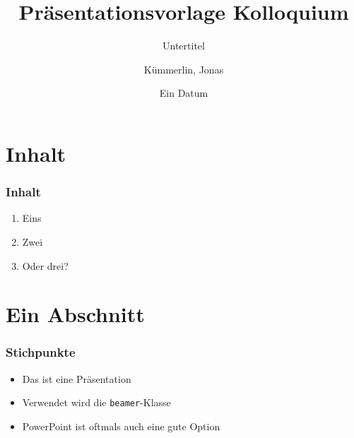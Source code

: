 \usepackage{iftex}
\ifPDFTeX
    \usepackage[utf8]{inputenc}
    \usepackage[T1]{fontenc}
    \usepackage{lmodern}
    \usepackage[ngerman]{babel}
\fi
\ifLuaTeX
    \usepackage{fontspec}
    \setmainfont{CMU Serif}
    \usepackage{polyglossia}
    \setdefaultlanguage[spelling=new,babelshorthands=true]{german}
\fi
\ifXeTeX
    \usepackage{fontspec}
    \setmainfont{CMU Serif}
    \usepackage{polyglossia}
    \setdefaultlanguage[spelling=new,babelshorthands=true]{german}
\fi
\usepackage{microtype}
\usepackage{beamerthemedefault}



\title{Präsentationsvorlage Kolloquium}
\subtitle{Untertitel}
\author{Kümmerlin, Jonas}
\date{Ein Datum}
\subject{Projektarbeit}



\frame{\titlepage}
\section{Inhalt}
\begin{frame}
    \frametitle{Inhalt}
    \begin{enumerate}
        \item Eins
        \item Zwei
        \item Oder drei?
    \end{enumerate}
\end{frame}
\section{Ein Abschnitt}
\begin{frame}
    \frametitle{Stichpunkte}
    \begin{itemize}
        \item<+-> Das ist eine Präsentation
        \item<+-> Verwendet wird die \texttt{beamer}-Klasse \cite{tantau2010latex}
        \item<+-> PowerPoint ist oftmals auch eine gute Option
    \end{itemize}
\end{frame}
